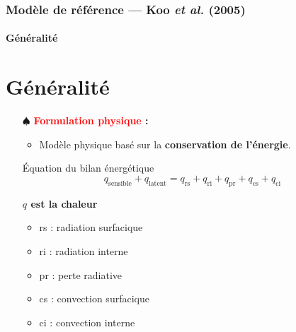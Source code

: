 \documentclass[handout]{beamer}
\newtheorem{pbm et hypo}[thm]{Problématique et hypothèses}
\begin{document}
	\begin{frame}
		\frametitle{\textbf{Modèle de référence — Koo \textit{et al.} (2005)}}
		\framesubtitle{\textbf{Généralité}}
		\section{Généralité}
		\begin{itemize}
			\item[$\spadesuit$] \textbf{\textcolor{red}{Formulation physique} : } \pause 
			\begin{itemize}
				\item Modèle physique basé sur la \textbf{conservation de l'énergie}. \pause
					\end{itemize}
					\begin{block}{Équation du bilan énergétique}
					\vspace{-1.5ex}
					\begin{equation}\label{f:conservation}
						q_{\text{sensible}} + q_{\text{latent}} = q_{\text{rs}}  + q_{\text{ri}} + q_{\text{pr}}+ q_{\text{cs}} + q_{\text{ci}}
					\end{equation}
				\end{block}\pause
				\vspace{0.3cm}
			\textbf{$q$ est la chaleur}
					\begin{itemize}
						\item rs : radiation surfacique
						\item ri : radiation interne
						\item pr : perte radiative
						\item cs : convection surfacique 
						\item ci : convection interne
					\end{itemize}		
		\end{itemize}
	\end{frame}
\end{document}
